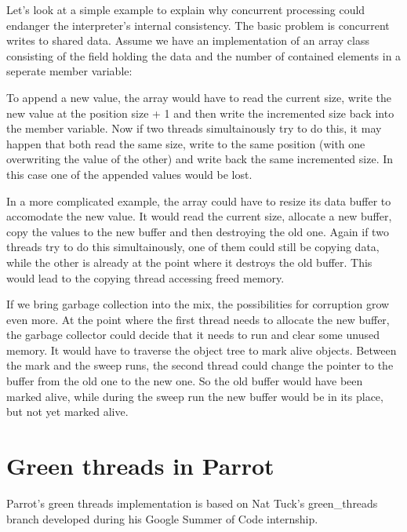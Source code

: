 \documentclass[bachelor,english]{hgbthesis}
\begin{document}
Let's look at a simple example to explain why concurrent processing could endanger the interpreter's internal consistency. The basic problem is concurrent writes to shared data. Assume we have an implementation of an array class consisting of the field holding the data and the number of contained elements in a seperate member variable:
\begin{CCode}
pmclass ResizableIntegerArray auto_attrs provides array {
    ATTR INTVAL   size;      /* number of INTVALs stored in this array */
    ATTR INTVAL * int_array; /* INTVALs are stored here */
\end{CCode}
To append a new value, the array would have to read the current size, write the new value at the position size + 1 and then write the incremented size back into the member variable.
Now if two threads simultainously try to do this, it may happen that both read the same size, write to the same position (with one overwriting the value of the other) and write back the same incremented size. In this case one of the appended values would be lost.

In a more complicated example, the array could have to resize its data buffer to accomodate the new value. It would read the current size, allocate a new buffer, copy the values to the new buffer and then destroying the old one. Again if two threads try to do this simultainously, one of them could still be copying data, while the other is already at the point where it destroys the old buffer. This would lead to the copying thread accessing freed memory.

If we bring garbage collection into the mix, the possibilities for corruption grow even more. At the point where the first thread needs to allocate the new buffer, the garbage collector could decide that it needs to run and clear some unused memory. It would have to traverse the object tree to mark alive objects. Between the mark and the sweep runs, the second thread could change the pointer to the buffer from the old one to the new one. So the old buffer would have been marked alive, while during the sweep run the new buffer would be in its place, but not yet marked alive.

\section{Green threads in Parrot}

Parrot's green threads implementation is based on Nat Tuck's green\_threads branch developed during his Google Summer of Code internship.
\end{document}

